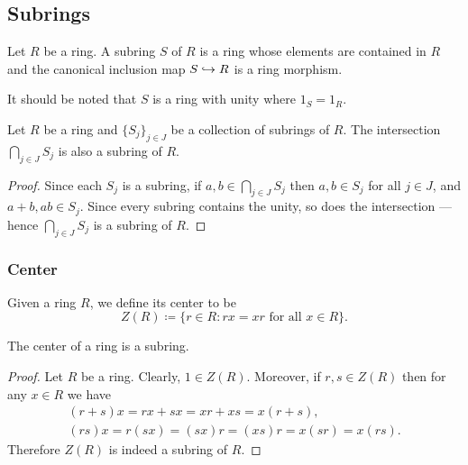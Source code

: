\subsection{Subrings}

%
\begin{definition}[Subring]
\label{def:subring}
Let \(R\) be a ring. A subring \(S\) of \(R\) is a ring whose elements are
contained in \(R\) and the canonical inclusion map \(S \hookrightarrow R\) is a ring
morphism.
\end{definition}
%

%
\begin{remark}
\label{rem:subring-same-unity}
It should be noted that \(S\) is a ring with unity where \(1_S = 1_R\).
\end{remark}
%

%
\begin{proposition}
\label{prop:intersection-subring-is-subring}
Let \(R\) be a ring and \(\{S_{j}\}_{j \in J}\) be a collection of subrings of
\(R\). The intersection \(\bigcap_{j \in J} S_j\) is also a subring of \(R\).
\end{proposition}
%

%
\begin{proof}
Since each \(S_j\) is a subring, if \(a, b \in \bigcap_{j \in J} S_j\) then \(a,
b \in S_j\) for all \(j \in J\), and \(a + b, a b \in S_j\). Since every subring
contains the unity, so does the intersection --- hence \(\bigcap_{j \in J} S_j\)
is a subring of \(R\).
\end{proof}
%


\subsubsection{Center}

%
\begin{definition}[Center]
\label{def:ring-center}
Given a ring \(R\), we define its center to be
\[
Z(R) \coloneq \{r \in R \colon r x = x r \text{ for all } x \in R\}.
\]
\end{definition}
%

%
\begin{corollary}
\label{cor:center-is-subring}
The center of a ring is a subring.
\end{corollary}
%

%
\begin{proof}
Let \(R\) be a ring. Clearly, \(1 \in Z(R)\). Moreover, if \(r, s \in Z(R)\)
then for any \(x \in R\) we have
\begin{gather*}
(r + s) x = r x + s x = x r + x s = x (r + s), \\
(r s) x = r(s x) = (s x) r = (x s) r = x (s r) = x (r s).
\end{gather*}
Therefore \(Z(R)\) is indeed a subring of \(R\).
\end{proof}
%


